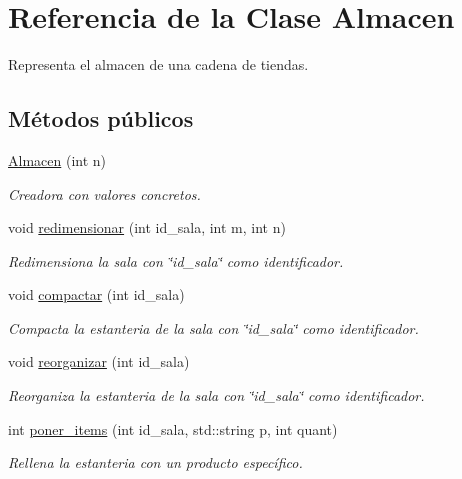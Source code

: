 \hypertarget{class_almacen}{}\section{Referencia de la Clase Almacen}
\label{class_almacen}


Representa el almacen de una cadena de tiendas.  


\subsection*{Métodos públicos}
\begin{DoxyCompactItemize}
\item 
\mbox{\hyperlink{class_almacen_ae5ed0e91d616199b8dbdc1f8780a7efb}{Almacen}} (int n)
\begin{DoxyCompactList}\small\item\em Creadora con valores concretos. \end{DoxyCompactList}\item 
void \mbox{\hyperlink{class_almacen_a3536398091b48ede58353ad3a8a2718b}{redimensionar}} (int id\+\_\+sala, int m, int n)
\begin{DoxyCompactList}\small\item\em Redimensiona la sala con \char`\"{}id\+\_\+sala\char`\"{} como identificador. \end{DoxyCompactList}\item 
void \mbox{\hyperlink{class_almacen_a07e1c7a15df51e7361c81104044e83c6}{compactar}} (int id\+\_\+sala)
\begin{DoxyCompactList}\small\item\em Compacta la estanteria de la sala con \char`\"{}id\+\_\+sala\char`\"{} como identificador. \end{DoxyCompactList}\item 
void \mbox{\hyperlink{class_almacen_a0a1e01bf275ad983f13ff75ba9476455}{reorganizar}} (int id\+\_\+sala)
\begin{DoxyCompactList}\small\item\em Reorganiza la estanteria de la sala con \char`\"{}id\+\_\+sala\char`\"{} como identificador. \end{DoxyCompactList}\item 
int \mbox{\hyperlink{class_almacen_ad2829b7fb8be4ced00511472636982bf}{poner\+\_\+items}} (int id\+\_\+sala, std\+::string p, int quant)
\begin{DoxyCompactList}\small\item\em Rellena la estanteria con un producto específico. \end{DoxyCompactList}\item 

\end{DoxyCompactItemize}
